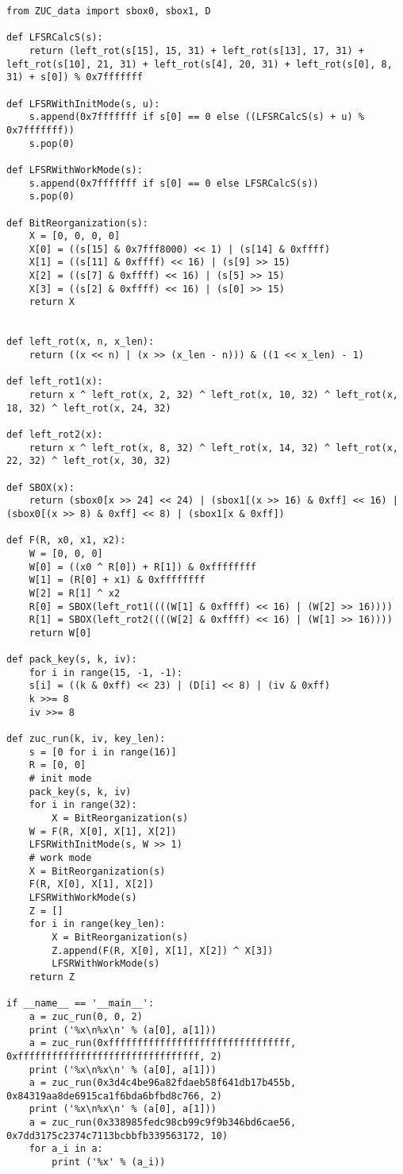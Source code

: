 \documentclass[a4paper, zihao=-4, UTF-8]{ctexart}
\begin{document}
			\begin{lstlisting}[caption={ZUC算法测试样例}, label={lst:zuctestdata}]
from ZUC_data import sbox0, sbox1, D

def LFSRCalcS(s):
	return (left_rot(s[15], 15, 31) + left_rot(s[13], 17, 31) + left_rot(s[10], 21, 31) + left_rot(s[4], 20, 31) + left_rot(s[0], 8, 31) + s[0]) % 0x7fffffff

def LFSRWithInitMode(s, u):
	s.append(0x7fffffff if s[0] == 0 else ((LFSRCalcS(s) + u) % 0x7fffffff))
	s.pop(0)

def LFSRWithWorkMode(s):
	s.append(0x7fffffff if s[0] == 0 else LFSRCalcS(s))
	s.pop(0)

def BitReorganization(s):
	X = [0, 0, 0, 0]
	X[0] = ((s[15] & 0x7fff8000) << 1) | (s[14] & 0xffff)
	X[1] = ((s[11] & 0xffff) << 16) | (s[9] >> 15)
	X[2] = ((s[7] & 0xffff) << 16) | (s[5] >> 15)
	X[3] = ((s[2] & 0xffff) << 16) | (s[0] >> 15)
	return X


def left_rot(x, n, x_len):
	return ((x << n) | (x >> (x_len - n))) & ((1 << x_len) - 1)

def left_rot1(x):
	return x ^ left_rot(x, 2, 32) ^ left_rot(x, 10, 32) ^ left_rot(x, 18, 32) ^ left_rot(x, 24, 32)

def left_rot2(x):
	return x ^ left_rot(x, 8, 32) ^ left_rot(x, 14, 32) ^ left_rot(x, 22, 32) ^ left_rot(x, 30, 32)

def SBOX(x):
	return (sbox0[x >> 24] << 24) | (sbox1[(x >> 16) & 0xff] << 16) | (sbox0[(x >> 8) & 0xff] << 8) | (sbox1[x & 0xff])

def F(R, x0, x1, x2):
	W = [0, 0, 0]
	W[0] = ((x0 ^ R[0]) + R[1]) & 0xffffffff
	W[1] = (R[0] + x1) & 0xffffffff
	W[2] = R[1] ^ x2
	R[0] = SBOX(left_rot1((((W[1] & 0xffff) << 16) | (W[2] >> 16))))
	R[1] = SBOX(left_rot2((((W[2] & 0xffff) << 16) | (W[1] >> 16))))
	return W[0]

def pack_key(s, k, iv):
	for i in range(15, -1, -1):
	s[i] = ((k & 0xff) << 23) | (D[i] << 8) | (iv & 0xff)
	k >>= 8
	iv >>= 8

def zuc_run(k, iv, key_len):
	s = [0 for i in range(16)]
	R = [0, 0]
	# init mode
	pack_key(s, k, iv)
	for i in range(32):
		X = BitReorganization(s)
	W = F(R, X[0], X[1], X[2])
	LFSRWithInitMode(s, W >> 1)
	# work mode
	X = BitReorganization(s)
	F(R, X[0], X[1], X[2])
	LFSRWithWorkMode(s)
	Z = []
	for i in range(key_len):
		X = BitReorganization(s)
		Z.append(F(R, X[0], X[1], X[2]) ^ X[3])
		LFSRWithWorkMode(s)
	return Z

if __name__ == '__main__':
	a = zuc_run(0, 0, 2)
	print ('%x\n%x\n' % (a[0], a[1]))
	a = zuc_run(0xffffffffffffffffffffffffffffffff, 0xffffffffffffffffffffffffffffffff, 2)
	print ('%x\n%x\n' % (a[0], a[1]))
	a = zuc_run(0x3d4c4be96a82fdaeb58f641db17b455b, 0x84319aa8de6915ca1f6bda6bfbd8c766, 2)
	print ('%x\n%x\n' % (a[0], a[1]))
	a = zuc_run(0x338985fedc98cb99c9f9b346bd6cae56, 0x7dd3175c2374c7113bcbbfb339563172, 10)
	for a_i in a:
		print ('%x' % (a_i))
			\end{lstlisting}
\end{document}

